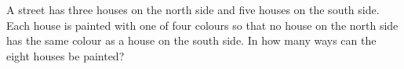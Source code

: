 A street has three houses on the north side and five houses on the south side. Each house is painted with one of four colours so that no house on the north side has the same colour as a house on the south side. In how many ways can the eight houses be painted?
